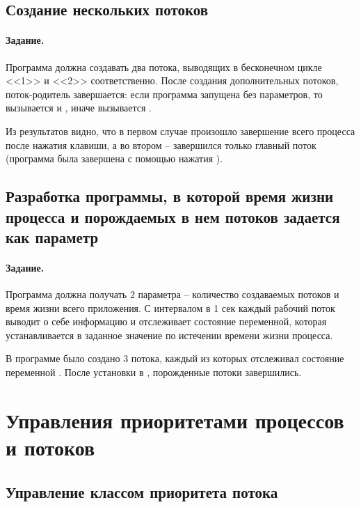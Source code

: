 \subsection{Создание нескольких потоков}

\paragraph{Задание.} Программа должна создавать два потока, выводящих в бесконечном цикле <<1>> и <<2>> соответственно. После создания дополнительных потоков, поток-родитель завершается: если программа запущена без параметров, то вызывается  и , иначе вызывается .


Из результатов видно, что в первом случае произошло завершение всего процесса после нажатия клавиши, а во втором -- завершился только главный поток (программа была завершена с помощью нажатия ).

\subsection{Разработка программы, в которой время жизни процесса и порождаемых в нем потоков задается как параметр}

\paragraph{Задание.} Программа должна получать 2 параметра -- количество создаваемых потоков и время жизни всего приложения. С интервалом в 1 сек каждый рабочий поток выводит о себе информацию и отслеживает состояние переменной, которая устанавливается в заданное значение по истечении времени жизни процесса.


В программе было создано 3 потока, каждый из которых отслеживал состояние переменной . После установки  в , порожденные потоки завершились.

\section{Управления приоритетами процессов и потоков}

\subsection{Управление классом приоритета потока}

